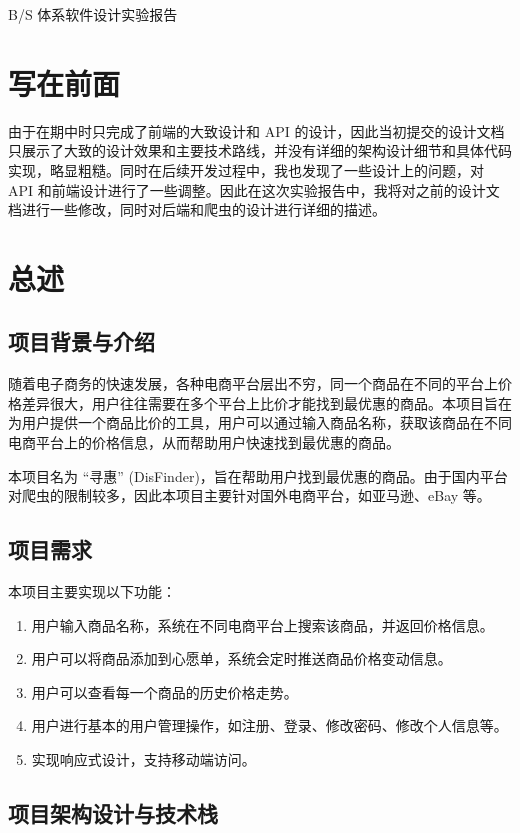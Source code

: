 B/S 体系软件设计实验报告
\chapter{写在前面}

由于在期中时只完成了前端的大致设计和 API 的设计，因此当初提交的设计文档只展示了大致的设计效果和主要技术路线，并没有详细的架构设计细节和具体代码实现，略显粗糙。同时在后续开发过程中，我也发现了一些设计上的问题，对 API 和前端设计进行了一些调整。因此在这次实验报告中，我将对之前的设计文档进行一些修改，同时对后端和爬虫的设计进行详细的描述。

\chapter{总述}

\section{项目背景与介绍}

随着电子商务的快速发展，各种电商平台层出不穷，同一个商品在不同的平台上价格差异很大，用户往往需要在多个平台上比价才能找到最优惠的商品。本项目旨在为用户提供一个商品比价的工具，用户可以通过输入商品名称，获取该商品在不同电商平台上的价格信息，从而帮助用户快速找到最优惠的商品。

本项目名为 “寻惠” (DisFinder)，旨在帮助用户找到最优惠的商品。由于国内平台对爬虫的限制较多，因此本项目主要针对国外电商平台，如亚马逊、eBay 等。

\section{项目需求}

本项目主要实现以下功能：

\begin{enumerate}
  \item 用户输入商品名称，系统在不同电商平台上搜索该商品，并返回价格信息。
  \item 用户可以将商品添加到心愿单，系统会定时推送商品价格变动信息。
  \item 用户可以查看每一个商品的历史价格走势。
  \item 用户进行基本的用户管理操作，如注册、登录、修改密码、修改个人信息等。
  \item 实现响应式设计，支持移动端访问。
\end{enumerate}

\section{项目架构设计与技术栈}

